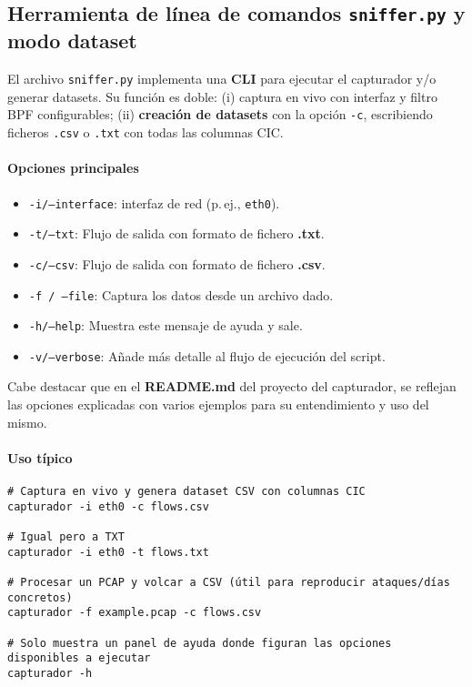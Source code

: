 \subsection*{Herramienta de línea de comandos \texttt{sniffer.py} y modo dataset}
El archivo \texttt{sniffer.py} implementa una \textbf{CLI} para ejecutar el capturador y/o generar datasets. Su función es doble: (i) captura en vivo con interfaz y filtro BPF configurables; (ii) \textbf{creación de datasets} con la opción \texttt{-c}, escribiendo ficheros \texttt{.csv} o \texttt{.txt} con todas las columnas CIC.

\paragraph{Opciones principales}
\begin{itemize}
  \item \texttt{-i/--interface}: interfaz de red (p.\,ej., \texttt{eth0}).
  \item \texttt{-t/--txt}: Flujo de salida con formato de fichero \textbf{.txt}.
  \item \texttt{-c/--csv}: Flujo de salida con formato de fichero \textbf{.csv}.
  \item \texttt{-f / --file}: Captura los datos desde un archivo dado.
  \item \texttt{-h/--help}: Muestra este mensaje de ayuda y sale.
  \item \texttt{-v/--verbose}: Añade más detalle al flujo de ejecución del script.
\end{itemize}

Cabe destacar que en el \textbf{README.md} del proyecto del capturador, se reflejan las opciones explicadas con varios ejemplos para su entendimiento y uso del mismo.

\paragraph{Uso típico}
\begin{lstlisting}[style=tfgbash,caption={Invocaciones representativas de sniffer.py},label=List.SnifferCLI]
# Captura en vivo y genera dataset CSV con columnas CIC
capturador -i eth0 -c flows.csv

# Igual pero a TXT 
capturador -i eth0 -t flows.txt

# Procesar un PCAP y volcar a CSV (útil para reproducir ataques/días concretos)
capturador -f example.pcap -c flows.csv

# Solo muestra un panel de ayuda donde figuran las opciones disponibles a ejecutar
capturador -h
\end{lstlisting}

